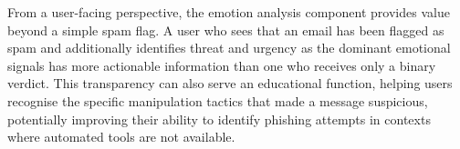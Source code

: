 From a user-facing perspective, the emotion analysis component provides value beyond a simple spam flag. A user who sees that an email has been flagged as spam and additionally identifies threat and urgency as the dominant emotional signals has more actionable information than one who receives only a binary verdict. This transparency can also serve an educational function, helping users recognise the specific manipulation tactics that made a message suspicious, potentially improving their ability to identify phishing attempts in contexts where automated tools are not available.